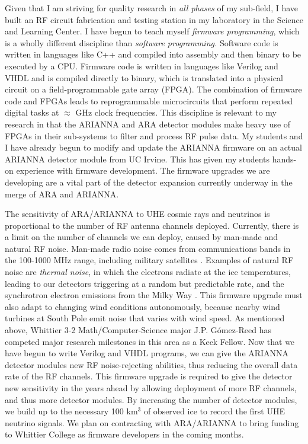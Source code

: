\documentclass[../../main.tex]{subfiles}
\begin{document}
Given that I am striving for quality research in \textit{all phases} of my sub-field, I have built an RF circuit fabrication and testing station in my laboratory in the Science and Learning Center.  I have begun to teach myself \textit{firmware programming}, which is a wholly different discipline than \textit{software programming.}  Software code is written in languages like C++ and compiled into assembly and then binary to be executed by a CPU.  Firmware code is written in languages like Verilog and VHDL and is compiled directly to binary, which is translated into a physical circuit on a field-programmable gate array (FPGA).  The combination of firmware code and FPGAs leads to reprogrammable microcircuits that perform repeated digital tasks at $\approx$ GHz clock frequencies.  This discipline is relevant to my research in that the ARIANNA and ARA detector modules make heavy use of FPGAs in their sub-systems to filter and process RF pulse data.  My students and I have already begun to modify and update the ARIANNA firmware on an actual ARIANNA detector module from UC Irvine.  This has given my students hands-on experience with firmware development.  The firmware upgrades we are developing are a vital part of the detector expansion currently underway in the merge of ARA and ARIANNA.

The sensitivity of ARA/ARIANNA to UHE cosmic rays and neutrinos is proportional to the number of RF antenna channels deployed.  Currently, there is a limit on the number of channels we can deploy, caused by man-made and natural RF noise.  Man-made radio noise comes from communications bands in the 100-1000 MHz range, including military satellites \cite{ALLISON201847}.  Examples of natural RF noise are \textit{thermal noise}, in which the electrons radiate at the ice temperatures, leading to our detectors triggering at a random but predictable rate, and the synchrotron electron emissions from the Milky Way \cite{barwick2016radio}.  This firmware upgrade must also adapt to changing wind conditions autonomously, because nearby wind turbines at South Pole emit noise that varies with wind speed. As mentioned above, Whittier 3-2 Math/Computer-Science major J.P. G\'{o}mez-Reed has competed major research milestones in this area as a Keck Fellow.  Now that we have begun to write Verilog and VHDL programs, we can give the ARIANNA detector modules new RF noise-rejecting abilities, thus reducing the overall data rate of the RF channels.  This firmware upgrade is required to give the detector new sensitivity in the years ahead by allowing deployment of more RF channels, and thus more detector modules.  By increasing the number of detector modules, we build up to the necessary 100 km$^3$ of observed ice to record the first UHE neutrino signals. We plan on contracting with ARA/ARIANNA to bring funding to Whittier College as firmware developers in the coming months.
\end{document}
